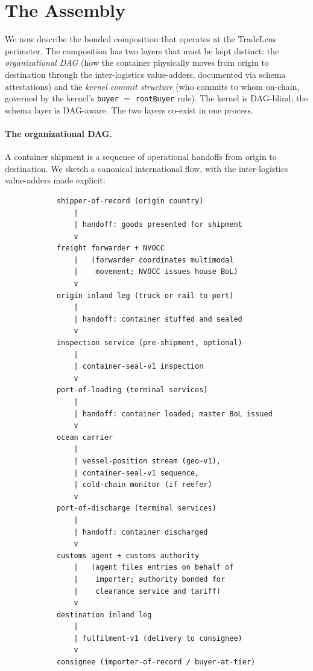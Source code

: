 \documentclass[11pt,a4paper]{article}
\theoremstyle{definition}
\theoremstyle{remark}
\begin{document}
\section{The Assembly}
\label{sec:assembly}

We now describe the bonded composition that operates at the
TradeLens perimeter. The composition has two layers that must be
kept distinct: the \emph{organizational DAG} (how the container
physically moves from origin to destination through the
inter-logistics value-adders, documented via schema attestations)
and the \emph{kernel commit structure} (who commits to whom
on-chain, governed by the kernel's \texttt{buyer} $=$
\texttt{rootBuyer} rule). The kernel is DAG-blind; the schema
layer is DAG-aware. The two layers co-exist in one process.

\paragraph{The organizational DAG.}
A container shipment is a sequence of operational handoffs from
origin to destination. We sketch a canonical international flow,
with the inter-logistics value-adders made explicit:

\begin{verbatim}
            shipper-of-record (origin country)
                |
                | handoff: goods presented for shipment
                v
            freight forwarder + NVOCC
                |   (forwarder coordinates multimodal
                |    movement; NVOCC issues house BoL)
                v
            origin inland leg (truck or rail to port)
                |
                | handoff: container stuffed and sealed
                v
            inspection service (pre-shipment, optional)
                |
                | container-seal-v1 inspection
                v
            port-of-loading (terminal services)
                |
                | handoff: container loaded; master BoL issued
                v
            ocean carrier
                |
                | vessel-position stream (geo-v1),
                | container-seal-v1 sequence,
                | cold-chain monitor (if reefer)
                v
            port-of-discharge (terminal services)
                |
                | handoff: container discharged
                v
            customs agent + customs authority
                |   (agent files entries on behalf of
                |    importer; authority bonded for
                |    clearance service and tariff)
                v
            destination inland leg
                |
                | fulfilment-v1 (delivery to consignee)
                v
            consignee (importer-of-record / buyer-at-tier)
\end{verbatim}
\end{document}
